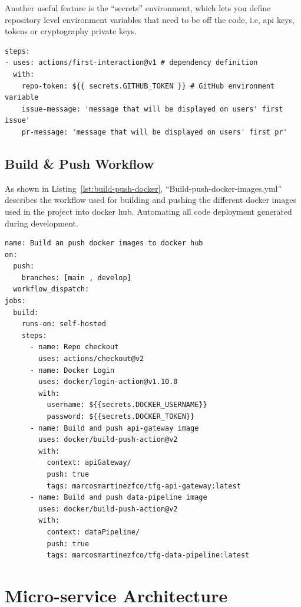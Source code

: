 Another useful feature is the \enquote{secrets} environment, which lets you define repository level environment variables that need to be off the code, i.e, \gls{api} keys, tokens or cryptography private keys.

\begin{lstlisting}[caption=Steps Definition,label={lst:step-definition}]
steps:
- uses: actions/first-interaction@v1 # dependency definition
  with:
    repo-token: ${{ secrets.GITHUB_TOKEN }} # GitHub environment variable
    issue-message: 'message that will be displayed on users' first issue'
    pr-message: 'message that will be displayed on users' first pr'
\end{lstlisting}

\subsection{Build \& Push Workflow}

As shown in Listing~\ref{lst:build-push-docker}, \enquote{Build-push-docker-images.yml} describes the workflow used for building and pushing the different docker images used in the project into docker hub. Automating all code deployment generated during development.

\begin{lstlisting}[caption=build-push-docker-images.yml,label={lst:build-push-docker}]
name: Build an push docker images to docker hub
on:
  push:
    branches: [main , develop]
  workflow_dispatch:
jobs:
  build:
    runs-on: self-hosted
    steps:
      - name: Repo checkout
        uses: actions/checkout@v2
      - name: Docker Login
        uses: docker/login-action@v1.10.0
        with:
          username: ${{secrets.DOCKER_USERNAME}}
          password: ${{secrets.DOCKER_TOKEN}}
      - name: Build and push api-gateway image
        uses: docker/build-push-action@v2
        with:
          context: apiGateway/
          push: true
          tags: marcosmartinezfco/tfg-api-gateway:latest
      - name: Build and push data-pipeline image
        uses: docker/build-push-action@v2
        with:
          context: dataPipeline/
          push: true
          tags: marcosmartinezfco/tfg-data-pipeline:latest
\end{lstlisting}

\section{Micro-service Architecture}
\label{Micro-service Architecture}

